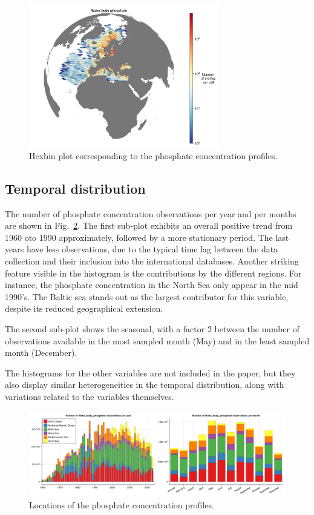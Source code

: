 \documentclass[essd, manuscript]{copernicus}
\begin{document}
\begin{figure}[t]
\includegraphics[width=8.3cm]{observations_Water_body_phosphate_hex.png}
\caption{Hexbin plot corresponding to the phosphate concentration profiles.\label{fig:phosphatedatahexbin}}
\end{figure}

\subsection{Temporal distribution}

The number of phosphate concentration observations per year and per months are shown in Fig.~\ref{fig:phosphatetime}. The first sub-plot exhibits an overall positive trend from 1960 oto 1990 approximately, followed by a more stationary period. The last years have less observations, due to the typical time lag between the data collection and their inclusion into the international databases. Another striking feature visible in the histogram is the contributions by the different regions. For instance, the phosphate concentration in the North Sea only appear in the mid 1990's. The Baltic sea stands out as the largest contributor for this variable, despite its reduced geographical extension.

The second sub-plot shows the seasonal, with a factor 2 between the number of observations available in the most sampled month (May) and in the least sampled month (December). 

The histograms for the other variables are not included in the paper, but they also display similar heterogeneities in the temporal distribution, along with variations related to the variables themselves. 

\begin{figure}[t]
\centering
\includegraphics[width=\textwidth]{stacked_histogram_Water_body_phosphate.png}
\caption{Locations of the phosphate concentration profiles.\label{fig:phosphatetime}}
\end{figure}
\end{document}
